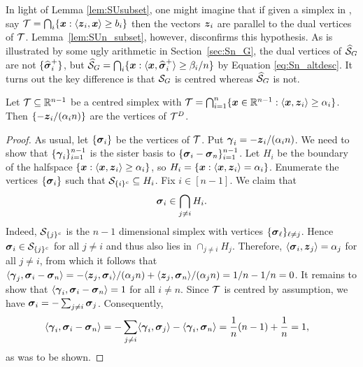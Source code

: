 In light of Lemma \ref{lem:SUsubset}, one might imagine that if given a simplex in \hdesc, say $\mathcal{T}=\bigcap_i \{\vb*{x}:\langle \vb*{z}_i,\vb*{x}\rangle \geq b_i\}$ then the vectors $\vb*{z}_i$ are parallel to the dual vertices of $\mathcal{T}$. Lemma~\ref{lem:SUn_subset}, however, disconfirms this hypothesis. As is illustrated by some ugly arithmetic in Section~\ref{sec:Sn_G}, the dual vertices of $\widehat{\mathcal{S}}_G$ are not $\{\widehat{\vb*{\sigma}}_i^+\}$, but $\widehat{\mathcal{S}}_G = \bigcap_i \{\vb*{x}:\langle \vb*{x},\widehat{\vb*{\sigma}}_i^+\rangle \geq \beta_i/n\}$ by Equation \eqref{eq:Sn_altdesc}. It turns out the key difference is that $\mathcal{S}_G$ is centred whereas $\widehat{\mathcal{S}}_G$ is not. 

\begin{lemma}
	\label{lem:hdesc_dual}
	Let $\mathcal{T}\subseteq\mathbb{R}^{n-1}$ be a centred simplex with $\mathcal{T}=\bigcap_{i=1}^n  \{\vb*{x}\in\mathbb{R}^{n-1}: \langle \vb*{x},\vb*{z}_i\rangle \geq  \alpha_i\}$. Then $\{-\vb*{z}_i/(\alpha_i n)\}$ are the vertices of $\mathcal{T}^D$. 
\end{lemma}
\begin{proof}
	As usual, let $\{\vb*{\sigma}_i\}$ be the vertices of $\mathcal{T}$. Put $\vb*{\gamma}_i = -\vb*{z}_i/(\alpha_i n)$. We need to show that $\{\vb*{\gamma}_i\}_{i=1}^{n-1}$ is the sister basis to $\{\vb*{\sigma}_i-\vb*{\sigma}_n\}_{i=1}^{n-1}$. Let $H_i$ be the boundary of the halfspace $\{\vb*{x}:\langle \vb*{x},\vb*{z}_i\rangle \geq \alpha_i\}$, so $H_i = \{\vb*{x}:\langle \vb*{x},\vb*{z}_i\rangle = \alpha_i\}$. Enumerate the vertices $\{\vb*{\sigma}_i\}$ such that $\mathcal{S}_{\{i\}^c} \subseteq H_i$. Fix $i\in[n-1]$. We claim that 
	\[\vb*{\sigma}_i \in \bigcap_{j\neq i}H_i.\]
	Indeed, $\mathcal{S}_{\{j\}^c}$ is the $n-1$ dimensional simplex with vertices $\{\vb*{\sigma}_\ell\}_{\ell\neq j}$. Hence $\vb*{\sigma}_i\in \mathcal{S}_{\{j\}^c}$ for all $j\neq i$ and thus also lies in $\cap_{j \neq i}H_j$. Therefore, $\langle \vb*{\sigma}_i,\vb*{z}_j\rangle = \alpha_j$ for all $j\neq i$, from which it follows  that $\langle \vb*{\gamma}_j,\vb*{\sigma}_i-\vb*{\sigma}_n\rangle = -\langle \vb*{z}_j,\vb*{\sigma}_i\rangle/(\alpha_j n) + \langle \vb*{z}_j,\vb*{\sigma}_n\rangle / (\alpha_j n )=1/n - 1/n =0$.  
	It remains to show that $\langle \vb*{\gamma}_i,\vb*{\sigma}_i-\vb*{\sigma}_n\rangle=1$ for all $i\neq n$. Since $\mathcal{T}$ is centred by assumption, we have $\vb*{\sigma}_i = -\sum_{j\neq i} \vb*{\sigma}_j$. Consequently, 
	\begin{align*}
	\langle \vb*{\gamma}_i,\vb*{\sigma}_i-\vb*{\sigma}_n\rangle &= -\sum_{j\neq i}\langle \vb*{\gamma}_i,\vb*{\sigma}_j\rangle - \langle \vb*{\gamma}_i,\vb*{\sigma}_n \rangle = \frac{1}{n}(n-1) + \frac{1}{n} = 1,
	\end{align*}
	as was to be shown.  
\end{proof}

